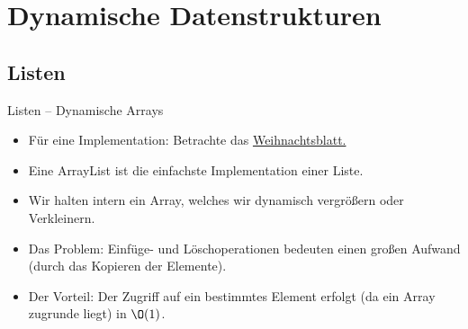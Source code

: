 \section{Dynamische Datenstrukturen}
\subsection{Listen}
\begin{frame}{Listen -- Dynamische Arrays}
    \begin{itemize}[<+(1)->]
        \widei
        \item Für eine Implementation: Betrachte das \href{https://github.com/EagleoutIce/eidi-weihnachttsblatt-19_20}{Weihnachtsblatt.\textsuperscript{\faGlobe}}
        \item Eine ArrayList ist die einfachste Implementation einer Liste.
        \item Wir halten intern ein Array, welches wir dynamisch vergrößern oder Verkleinern.
        \item Das Problem: Einfüge- und Löschoperationen bedeuten einen großen Aufwand (durch das Kopieren der Elemente).
        \item Der Vorteil: Der Zugriff auf ein bestimmtes Element erfolgt (da ein Array zugrunde liegt) in \(\O(1)\).
    \end{itemize}
\end{frame}

\def\Element#1{{\renewcommand{\arraystretch}{1.4}%
    \begin{tabular}{|>{\centering}p{1em}|p{1em}|}
        \hline\strut#1 & \\\hline
    \end{tabular}%
}}

\def\EndElement{{\renewcommand{\arraystretch}{1.5}%
    \begin{tabular}{|>{\centering\arraybackslash}p{1em}|}
        \hline\strut/\\\hline
    \end{tabular}
}}


